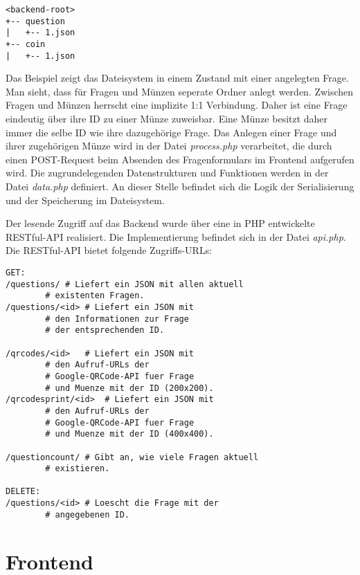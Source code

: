 \begin{verbatim}
<backend-root>
+-- question
|   +-- 1.json
+-- coin
|   +-- 1.json
\end{verbatim}

Das Beispiel zeigt das Dateisystem in einem Zustand mit einer angelegten Frage. Man sieht, dass für Fragen und Münzen seperate Ordner anlegt werden. Zwischen Fragen und Münzen herrscht eine implizite 1:1 Verbindung. Daher ist eine Frage eindeutig über ihre ID zu einer Münze zuweisbar. Eine Münze besitzt daher immer die selbe ID wie ihre dazugehörige Frage.
Das Anlegen einer Frage und ihrer zugehörigen Münze wird in der Datei \emph{process.php} verarbeitet, die durch einen POST-Request beim Absenden des Fragenformulars im Frontend aufgerufen wird. Die zugrundelegenden Datenstrukturen und Funktionen werden in der Datei \emph{data.php} definiert. An dieser Stelle befindet sich die Logik der Serialisierung und der Speicherung im Dateisystem.

Der lesende Zugriff auf das Backend wurde über eine in PHP entwickelte RESTful-API realisiert. Die Implementierung befindet sich in der Datei \emph{api.php}.
Die RESTful-API bietet folgende Zugriffs-URLs:

 \begin{lstlisting}
GET:
/questions/	# Liefert ein JSON mit allen aktuell
		# existenten Fragen.
/questions/<id>	# Liefert ein JSON mit 
		# den Informationen zur Frage
		# der entsprechenden ID.

/qrcodes/<id>	# Liefert ein JSON mit 
		# den Aufruf-URLs der
		# Google-QRCode-API fuer Frage
		# und Muenze mit der ID (200x200).
/qrcodesprint/<id>	# Liefert ein JSON mit 
		# den Aufruf-URLs der
		# Google-QRCode-API fuer Frage
		# und Muenze mit der ID (400x400).

/questioncount/	# Gibt an, wie viele Fragen aktuell 
		# existieren.

DELETE:
/questions/<id>	# Loescht die Frage mit der 
		# angegebenen ID.
\end{lstlisting}

%
%
%

\section{Frontend}